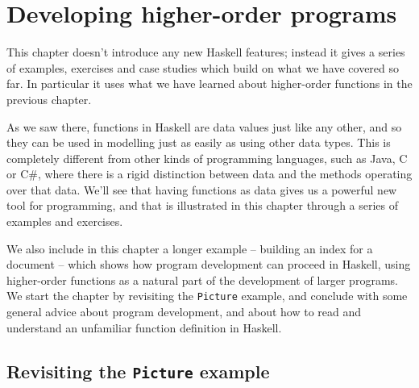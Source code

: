 





\chapter{Developing higher-order programs}
\chapstart
\label{moreDesign}
\label{developingHOPs}



This chapter doesn't introduce any new Haskell features; instead it gives a series of examples, exercises and case studies which build on what we have covered so far. In particular it uses what we have learned about higher-order functions in the previous chapter.

As we saw there, functions in Haskell are data values just like any other, and so they can be used in modelling just as easily as using other data types. This is completely different from other kinds of programming languages, such as Java, C or C\#, where there is a rigid distinction between data and the methods operating over that data. We'll see that having functions as data gives us a powerful new tool for programming, and that is illustrated in this chapter through a series of examples and exercises.

We also include in this chapter a longer example  -- building an index for a document -- which shows how program development can proceed in Haskell, using higher-order functions as a natural part of the development of larger programs. We start the chapter by revisiting the \texttt{Picture} example, and conclude with some general advice about program development, and about how to read and understand an unfamiliar function definition in Haskell.

\begin{webvideos}
\end{webvideos}

\section{Revisiting the \texttt{Picture} example}
\label{hofPicture}

